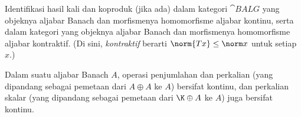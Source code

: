 \begin{exer} Identifikasi hasil kali dan koproduk (jika ada) dalam kategori $\cat{BALG}$
yang objeknya aljabar Banach
dan morfismenya homomorfisme aljabar kontinu, serta dalam kategori yang objeknya aljabar Banach dan
morfismenya homomorfisme aljabar kontraktif. (Di sini,
\emph{kontraktif} berarti $\norm{Tx} \le \norm x$ untuk setiap~$x$.)
\end{exer}

\begin{prop} Dalam suatu aljabar Banach $A$, operasi penjumlahan dan perkalian (yang dipandang sebagai
pemetaan dari $A \oplus A$ ke $A$) bersifat kontinu, dan perkalian skalar (yang dipandang sebagai pemetaan dari
$\K \oplus A$ ke $A$) juga bersifat kontinu.
\end{prop}
